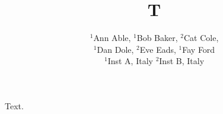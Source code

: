 \documentclass{article}
\begin{document}
\title{T}
\author{$^1$Ann Able, $^1$Bob Baker, $^2$Cat Cole, \\$^1$Dan Dole, $^2$Eve Eads, $^1$Fay Ford
\\
$^1$Inst A, Italy \quad $^2$Inst B, Italy}
\maketitle
Text.
\end{document}

